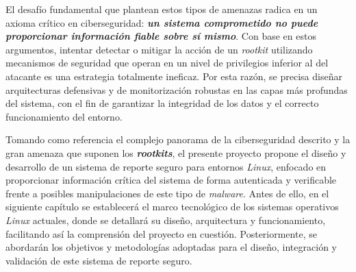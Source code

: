 El desafío fundamental que plantean estos tipos de amenazas radica en un axioma crítico en ciberseguridad: \textbf{\textit{un sistema comprometido no puede proporcionar información fiable sobre sí mismo}}.
Con base en estos argumentos, intentar detectar o mitigar la acción de un \textit{rootkit} utilizando mecanismos de seguridad que operan en un nivel de privilegios inferior al del atacante es una estrategia totalmente ineficaz.
Por esta razón, se precisa diseñar arquitecturas defensivas y de monitorización robustas en las capas más profundas del sistema, con el fin de garantizar la integridad de los datos y el correcto funcionamiento del entorno.

\newpage

Tomando como referencia el complejo panorama de la ciberseguridad descrito y la gran amenaza que suponen los \textbf{\textit{rootkits}}, el presente proyecto propone el diseño y desarrollo de un sistema de reporte seguro para entornos \textit{Linux}, enfocado en proporcionar información crítica del sistema de forma autenticada y verificable frente a posibles manipulaciones de este tipo de \textit{malware}.
Antes de ello, en el siguiente capítulo se establecerá el marco tecnológico de los sistemas operativos \textit{Linux} actuales, donde se detallará su diseño, arquitectura y funcionamiento, facilitando así la comprensión del proyecto en cuestión.
Posteriormente, se abordarán los objetivos y metodologías adoptadas para el diseño, integración y validación de este sistema de reporte seguro.
